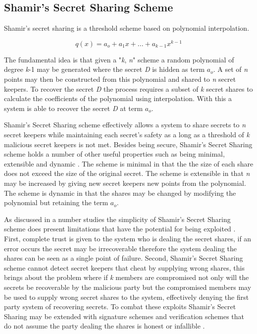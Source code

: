 \subsection{Shamir's Secret Sharing Scheme}
Shamir's secret sharing \cite{shamir1979share} is a threshold scheme based on polynomial interpolation. 

\[q(x) = a_o +a_1x + ... + a_{k-1}x^{k-1} \]

The fundamental idea is that given a "\textit{k}, \textit{n}" scheme a random polynomial of degree \textit{k}-1 may be generated where the secret \textit{D} is hidden as term \(a_o\). A set of \textit{n} points may then be constructed from this polynomial and shared to \textit{n} secret keepers. To recover the secret \textit{D} the process requires a subset of \textit{k} secret shares to calculate the coefficients of the polynomial using interpolation. With this a system is able to recover the secret \textit{D} at term \(a_o\).
\par
Shamir's Secret Sharing scheme effectively allows a system to share secrets to \textit{n} secret keepers while maintaining each secret's safety as a long as a threshold of \textit{k} malicious secret keepers is not met. Besides being secure, Shamir's Secret Sharing scheme holds a number of other useful properties such as being minimal, extensible and dynamic \cite{shamir1979share}. The scheme is minimal in that the the size of each share does not exceed the size of the original secret. The scheme is extensible in that \textit{n} may be increased by giving new secret keepers new points from the polynomial. The scheme is dynamic in that the shares may be changed by modifying the polynomial but retaining the term \(a_o\).
\par
As discussed in a number studies the simplicity of Shamir's Secret Sharing scheme does present limitations that have the potential for being exploited \cite{abdallah2015analysis}\cite{dautrich2012security}. First, complete trust is given to the system who is dealing the secret shares, if an error occurs the secret may be irrecoverable therefore the system dealing the shares can be seen as a single point of failure. Second, Shamir's Secret Sharing scheme cannot detect secret keepers that cheat by supplying wrong shares, this brings about the problem where if \textit{k} members are compromised not only will the secrets be recoverable by the malicious party but the compromised members may be used to supply wrong secret shares to the system, effectively denying the first party system of recovering secrets. To combat these exploits Shamir's Secret Sharing may be extended with signature schemes \cite{shoup2000practical}\cite{abdalla2001forward} and verification schemes that do not assume the party dealing the shares is honest or infallible \cite{herzberg1995proactive}\cite{cachin2002asynchronous}.
